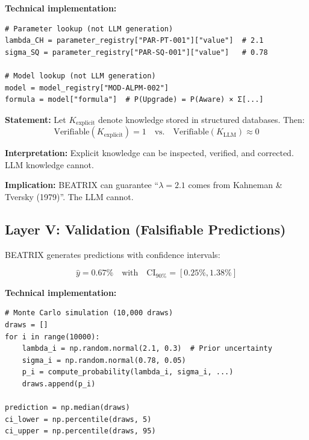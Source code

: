 \textbf{Technical implementation:}

\begin{verbatim}
# Parameter lookup (not LLM generation)
lambda_CH = parameter_registry["PAR-PT-001"]["value"]  # 2.1
sigma_SQ = parameter_registry["PAR-SQ-001"]["value"]   # 0.78

# Model lookup (not LLM generation)
model = model_registry["MOD-ALPM-002"]
formula = model["formula"]  # P(Upgrade) = P(Aware) × Σ[...]
\end{verbatim}

\begin{tcolorbox}[colback=gray!5!white, colframe=gray!75!black,
    title=Axiom BX-2: Explicit Knowledge]
\textbf{Statement:} Let $K_{\text{explicit}}$ denote knowledge stored in structured databases. Then:
\begin{equation}
\text{Verifiable}(K_{\text{explicit}}) = 1 \quad \text{vs.} \quad \text{Verifiable}(K_{\text{LLM}}) \approx 0
\end{equation}

\textbf{Interpretation:} Explicit knowledge can be inspected, verified, and corrected. LLM knowledge cannot.

\textbf{Implication:} BEATRIX can guarantee ``$\lambda = 2.1$ comes from Kahneman \& Tversky (1979)''. The LLM cannot.
\end{tcolorbox}


\subsection{Layer V: Validation (Falsifiable Predictions)}

BEATRIX generates predictions with confidence intervals:

\begin{equation}
\hat{y} = 0.67\% \quad \text{with} \quad \text{CI}_{90\%} = [0.25\%, 1.38\%]
\end{equation}

\textbf{Technical implementation:}

\begin{verbatim}
# Monte Carlo simulation (10,000 draws)
draws = []
for i in range(10000):
    lambda_i = np.random.normal(2.1, 0.3)  # Prior uncertainty
    sigma_i = np.random.normal(0.78, 0.05)
    p_i = compute_probability(lambda_i, sigma_i, ...)
    draws.append(p_i)

prediction = np.median(draws)
ci_lower = np.percentile(draws, 5)
ci_upper = np.percentile(draws, 95)
\end{verbatim}

